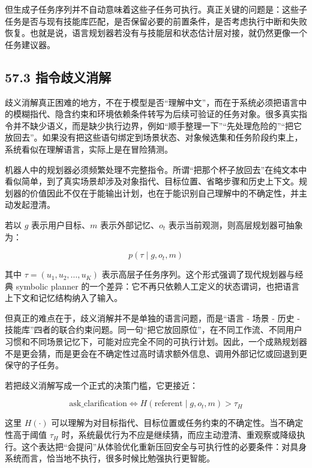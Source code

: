但生成子任务序列并不自动意味着这些子任务可执行。真正关键的问题是：这些子任务是否与现有技能库匹配，是否保留必要的前置条件，是否考虑执行中断和失败恢复。也就是说，语言规划器若没有与技能层和状态估计层对接，就仍然更像一个任务建议器。

\subsection*{57.3 指令歧义消解}


歧义消解真正困难的地方，不在于模型是否“理解中文”，而在于系统必须把语言中的模糊指代、隐含约束和环境依赖条件转写为后续可验证的任务对象。很多真实指令并不缺少语义，而是缺少执行边界，例如“顺手整理一下”“先处理危险的”“把它放回去”。如果没有把这些语句绑定到场景状态、对象候选集和任务阶段约束上，系统看似在理解语言，实际上是在冒险猜测。

机器人中的规划器必须频繁处理不完整指令。所谓“把那个杯子放回去”在纯文本中看似简单，到了真实场景却涉及对象指代、目标位置、省略步骤和历史上下文。规划器的价值因此不仅在于能输出计划，也在于能识别自己理解中的不确定性，并主动发起澄清。

若以 \(g\) 表示用户目标、\(m\) 表示外部记忆、\(o_t\) 表示当前观测，则高层规划器可抽象为：

\begin{equation*}
p(\tau \mid g, o_t, m)
\end{equation*}

其中 \(\tau = (u_1, u_2, \dots, u_K)\) 表示高层子任务序列。这个形式强调了现代规划器与经典 symbolic planner 的一个差异：它不再只依赖人工定义的状态谓词，也把语言上下文和记忆结构纳入了输入。

但真正的难点在于，歧义消解并不是单独的语言问题，而是“语言 - 场景 - 历史 - 技能库”四者的联合约束问题。同一句“把它放回原位”，在不同工作流、不同用户习惯和不同场景记忆下，可能对应完全不同的可执行计划。因此，一个成熟规划器不是更会猜，而是更会在不确定性过高时请求额外信息、调用外部记忆或回退到更保守的子任务。

若把歧义消解写成一个正式的决策门槛，它更接近：

\begingroup
\footnotesize
\begin{equation*}
\text{ask\_clarification} \Longleftrightarrow
H(\text{referent}\mid g,o_t,m) > \tau_H
\end{equation*}
\endgroup

这里 \(H(\cdot)\) 可以理解为对目标指代、目标位置或任务约束的不确定性。当不确定性高于阈值 \(\tau_H\) 时，系统最优行为不应是继续猜，而应主动澄清、重观察或降级执行。这个表达把“会提问”从体验优化重新压回安全与可执行性的必要条件：对具身系统而言，恰当地不执行，很多时候比勉强执行更智能。

